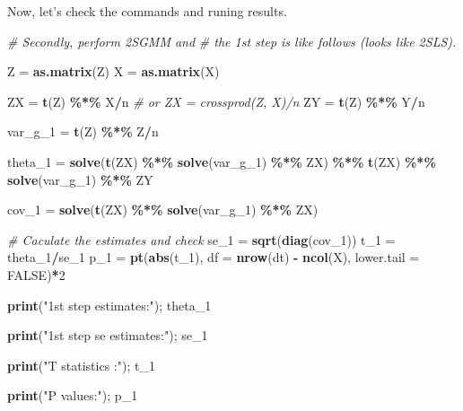 \documentclass[
  12pt,
]{article}
\newenvironment{Shaded}{\begin{snugshade}}{\end{snugshade}}
\newcommand{\CommentTok}[1]{\textcolor[rgb]{0.56,0.35,0.01}{\textit{#1}}}
\newcommand{\DataTypeTok}[1]{\textcolor[rgb]{0.13,0.29,0.53}{#1}}
\newcommand{\DecValTok}[1]{\textcolor[rgb]{0.00,0.00,0.81}{#1}}
\newcommand{\KeywordTok}[1]{\textcolor[rgb]{0.13,0.29,0.53}{\textbf{#1}}}
\newcommand{\NormalTok}[1]{#1}
\newcommand{\OperatorTok}[1]{\textcolor[rgb]{0.81,0.36,0.00}{\textbf{#1}}}
\newcommand{\OtherTok}[1]{\textcolor[rgb]{0.56,0.35,0.01}{#1}}
\newcommand{\StringTok}[1]{\textcolor[rgb]{0.31,0.60,0.02}{#1}}
\begin{document}
Now, let's check the commands and runing results.

\begin{Shaded}
\begin{Highlighting}[]
\CommentTok{\# Secondly, perform 2SGMM and }
\CommentTok{\# the 1st step is like follows (looks like 2SLS).}

\NormalTok{Z =}\StringTok{ }\KeywordTok{as.matrix}\NormalTok{(Z)}
\NormalTok{X =}\StringTok{ }\KeywordTok{as.matrix}\NormalTok{(X)}

\NormalTok{ZX =}\StringTok{ }\KeywordTok{t}\NormalTok{(Z) }\OperatorTok{\%*\%}\StringTok{ }\NormalTok{X}\OperatorTok{/}\NormalTok{n }\CommentTok{\# or ZX = crossprod(Z, X)/n}
\NormalTok{ZY =}\StringTok{ }\KeywordTok{t}\NormalTok{(Z) }\OperatorTok{\%*\%}\StringTok{ }\NormalTok{Y}\OperatorTok{/}\NormalTok{n}

\NormalTok{var\_g\_}\DecValTok{1}\NormalTok{ =}\StringTok{ }\KeywordTok{t}\NormalTok{(Z) }\OperatorTok{\%*\%}\StringTok{ }\NormalTok{Z}\OperatorTok{/}\NormalTok{n}

\NormalTok{theta\_}\DecValTok{1}\NormalTok{ =}\StringTok{ }\KeywordTok{solve}\NormalTok{(}\KeywordTok{t}\NormalTok{(ZX) }\OperatorTok{\%*\%}\StringTok{ }\KeywordTok{solve}\NormalTok{(var\_g\_}\DecValTok{1}\NormalTok{) }\OperatorTok{\%*\%}\StringTok{ }\NormalTok{ZX) }\OperatorTok{\%*\%}\StringTok{ }
\KeywordTok{t}\NormalTok{(ZX) }\OperatorTok{\%*\%}\StringTok{ }\KeywordTok{solve}\NormalTok{(var\_g\_}\DecValTok{1}\NormalTok{) }\OperatorTok{\%*\%}\StringTok{ }\NormalTok{ZY}

\NormalTok{cov\_}\DecValTok{1}\NormalTok{   =}\StringTok{ }\KeywordTok{solve}\NormalTok{(}\KeywordTok{t}\NormalTok{(ZX) }\OperatorTok{\%*\%}\StringTok{ }\KeywordTok{solve}\NormalTok{(var\_g\_}\DecValTok{1}\NormalTok{) }\OperatorTok{\%*\%}\StringTok{ }\NormalTok{ZX)}


\CommentTok{\# Caculate the estimates and check}
\NormalTok{se\_}\DecValTok{1}\NormalTok{  =}\StringTok{ }\KeywordTok{sqrt}\NormalTok{(}\KeywordTok{diag}\NormalTok{(cov\_}\DecValTok{1}\NormalTok{))}
\NormalTok{t\_}\DecValTok{1}\NormalTok{   =}\StringTok{ }\NormalTok{theta\_}\DecValTok{1}\OperatorTok{/}\NormalTok{se\_}\DecValTok{1}
\NormalTok{p\_}\DecValTok{1}\NormalTok{   =}\StringTok{ }\KeywordTok{pt}\NormalTok{(}\KeywordTok{abs}\NormalTok{(t\_}\DecValTok{1}\NormalTok{), }\DataTypeTok{df =} \KeywordTok{nrow}\NormalTok{(dt) }\OperatorTok{{-}}\StringTok{ }\KeywordTok{ncol}\NormalTok{(X), }\DataTypeTok{lower.tail =} \OtherTok{FALSE}\NormalTok{)}\OperatorTok{*}\DecValTok{2}

\KeywordTok{print}\NormalTok{(}\StringTok{"1st step estimates:"}\NormalTok{); theta\_}\DecValTok{1}

\KeywordTok{print}\NormalTok{(}\StringTok{"1st step se estimates:"}\NormalTok{); se\_}\DecValTok{1}

\KeywordTok{print}\NormalTok{(}\StringTok{"T statistics :"}\NormalTok{); t\_}\DecValTok{1}

\KeywordTok{print}\NormalTok{(}\StringTok{"P values:"}\NormalTok{); p\_}\DecValTok{1}
\end{Highlighting}
\end{Shaded}
\end{document}
